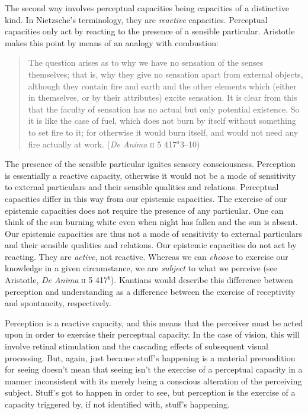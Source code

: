 \documentclass[12pt]{article}
\begin{document}
The second way involves perceptual capacities being capacities of a distinctive kind. In Nietzsche's \citeyearpar{Nietzsche1887On-the-Genealog} terminology, they are \emph{reactive} capacities. Perceptual capacities only act by reacting to the presence of a sensible particular. Aristotle makes this point by means of an analogy with combustion:
\begin{quote}
	The question arises as to why we have no sensation of the senses themselves; that is, why they give no sensation apart from external objects, although they contain fire and earth and the other elements which (either in themselves, or by their attributes) excite sensation. It is clear from this that the faculty of sensation has no actual but only potential existence. So it is like the case of fuel, which does not burn by itself without something to set fire to it; for otherwise it would burn itself, and would not need any fire actually at work. (\emph{De Anima} \textsc{ii} 5 417\( ^{a} \)3--10)
\end{quote}
The presence of the sensible particular ignites sensory consciousness. Perception is essentially a reactive capacity, otherwise it would not be a mode of sensitivity to external particulars and their sensible qualities and relations. Perceptual capacities differ in this way from our epistemic capacities. The exercise of our epistemic capacities does not require the presence of any particular. One can think of the sun burning white even when night has fallen and the sun is absent. Our epistemic capacities are thus not a mode of sensitivity to external particulars and their sensible qualities and relations. Our epistemic capacities do not act by reacting. They are \emph{active}, not reactive. Whereas we can \emph{choose} to exercise our knowledge in a given circumstance, we are \emph{subject} to what we perceive (see Aristotle, \emph{De Anima} \textsc{ii} 5 417\( ^{b} \)). Kantians would describe this difference between perception and understanding as a difference between the exercise of receptivity and spontaneity, respectively. 

Perception is a reactive capacity, and this means that the perceiver must be acted upon in order to exercise their perceptual capacity. In the case of vision, this will involve retinal stimulation and the cascading effects of subsequent visual processing. But, again, just because stuff's happening is a material precondition for seeing doesn't mean that seeing isn't the exercise of a perceptual capacity in a manner inconsistent with its merely being a conscious alteration of the perceiving subject. Stuff's got to happen in order to see, but perception is the exercise of a capacity triggered by, if not identified with, stuff's happening.
\end{document}
